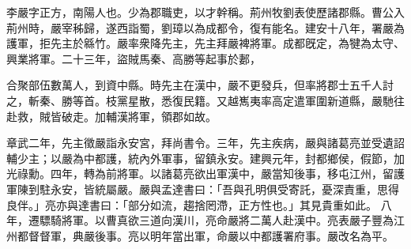 \begin{pinyinscope}
 
 
 李嚴字正方，南陽人也。少為郡職吏，以才幹稱。荊州牧劉表使歷諸郡縣。曹公入荊州時，嚴宰秭歸，遂西詣蜀，劉璋以為成都令，復有能名。建安十八年，署嚴為護軍，拒先主於緜竹。嚴率衆降先主，先主拜嚴裨將軍。成都旣定，為犍為太守、興業將軍。二十三年，盜賊馬秦、高勝等起事於郪，
 
 
 合聚部伍數萬人，到資中縣。時先主在漢中，嚴不更發兵，但率將郡士五千人討之，斬秦、勝等首。枝黨星散，悉復民籍。又越嶲夷率高定遣軍圍新道縣，嚴馳往赴救，賊皆破走。加輔漢將軍，領郡如故。
 
 
章武二年，先主徵嚴詣永安宮，拜尚書令。三年，先主疾病，嚴與諸葛亮並受遺詔輔少主；以嚴為中都護，統內外軍事，留鎮永安。建興元年，封都鄉侯，假節，加光祿勳。四年，轉為前將軍。以諸葛亮欲出軍漢中，嚴當知後事，移屯江州，留護軍陳到駐永安，皆統屬嚴。嚴與孟達書曰：「吾與孔明俱受寄託，憂深責重，思得良伴。」亮亦與達書曰：「部分如流，趨捨罔滯，正方性也。」其見貴重如此。
 八年，遷驃騎將軍。以曹真欲三道向漢川，亮命嚴將二萬人赴漢中。亮表嚴子豐為江州都督督軍，典嚴後事。亮以明年當出軍，命嚴以中都護署府事。嚴改名為平。
 

\end{pinyinscope}
